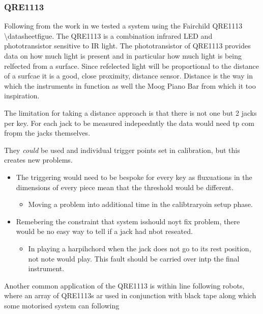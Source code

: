 \subsubsection{QRE1113}\label{qre1113}

Following from the work in \cite{McPherson2013, McPherson2019} we tested
a system using the Fairchild QRE1113 \textbackslash datasheetfigue. The
QRE1113 is a combination infrared LED and phototransistor sensitive to
IR light. The phototransistor of QRE1113 provides data on how much light
is present and in particular how much light is being relfected from a
surface. Since refelected light will be proportional to the distance of
a surfcae it is a good, close proximity, distance sensor. Distance is
the way in which the instruments in \cite{McPherson2013, McPherson2019}
function as well the Moog Piano Bar from which it too inspiration.

The limitation for taking a distance approach is that there is not one
but 2 jacks per key. For each jack to be measured indepeedntly the data
would need tp com fropm the jacks themselves.

They \emph{could} be used and individual trigger points set in
calibration, but this creates new problems.

\begin{itemize}
\item
  The triggering would need to be bespoke for every key as fluxuations
  in the dimensions of every piece mean that the threshold would be
  different.

  \begin{itemize}
  \item
    Moving a problem into additional time in the calibtraryoin setup
    phase.
  \end{itemize}
\item
  Remebering the constraint that system isshould noyt fix problem, there
  would be no easy way to tell if a jack had nbot reseated.

  \begin{itemize}
  \item
    In playing a harpihchord when the jack does not go to its rest
    position, not note would play. This fault should be carried over
    intp the final instrument.
  \end{itemize}
\end{itemize}

Another common application of the QRE1113 is within line following
robots, where an array of QRE1113s ar used in conjunction with black
tape along which some motorised system can following

